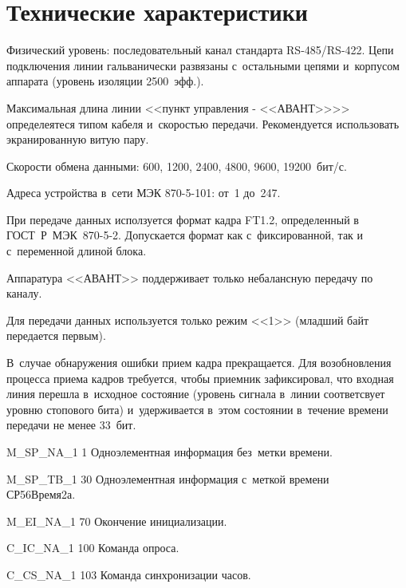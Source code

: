 \section{Технические характеристики} \label{sec:tth}

\begin{list}{--}{Технические характеристики:}
	\item Физический уровень: последовательный канал стандарта RS-485/RS-422. Цепи подключения линии гальванически развязаны с~остальными цепями и~корпусом аппарата (уровень изоляции 2500~эфф.).
	\item Максимальная длина линии <<пункт управления - <<АВАНТ>>>> определеятеся типом кабеля и~скоростью передачи. Рекомендуется использовать экранированную витую пару.
	\item Скорости обмена данными: 600, 1200, 2400, 4800, 9600, 19200~бит/с.
	\item Адреса устройства в~сети МЭК 870-5-101: от~1 до~247.
\end{list}

При передаче данных исползуется формат кадра FT1.2, определенный в ГОСТ~Р~МЭК~870-5-2. Допускается формат как с~фиксированной, так и с~переменной длиной блока.

Аппаратура <<АВАНТ>> поддерживает только небалансную передачу по каналу.

Для передачи данных используется только режим <<1>> (младший байт передается первым). 
 
В~случае обнаружения ошибки прием кадра прекращается. Для возобновления процесса приема кадров требуется, чтобы приемник зафиксировал, что входная линия перешла в~исходное состояние (уровень сигнала в~линии соответсвует уровню стопового бита) и~удерживается в~этом состоянии в~течение времени передачи не менее 33~бит.

\begin{list}{--}{Поддерживаются следующие стандартные идентификаторы типа (ASDU):}
	\item M\_SP\_NA\_1 1 Одноэлементная информация без~метки времени.
	\item M\_SP\_TB\_1 30 Одноэлементная информация с~меткой времени \\ СР56Время2а.
	\item M\_EI\_NA\_1 70 Окончение инициализации.
	\item C\_IC\_NA\_1 100 Команда опроса.
	\item C\_CS\_NA\_1 103 Команда синхронизации часов.
\end{list}


